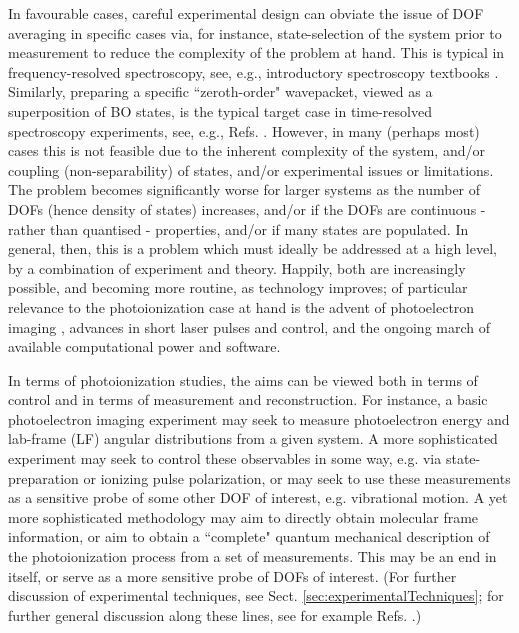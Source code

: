 \documentclass[10pt]{article}
\begin{document}
In favourable cases, careful experimental design can obviate the issue of DOF averaging in specific cases via, for instance, state-selection of the system prior to measurement to reduce the complexity of the problem at hand. This is typical in frequency-resolved spectroscopy, see, e.g., introductory spectroscopy textbooks \cite{bunkerMolSymm, herzberg1945molecular, hollasHighRes}. Similarly, preparing a specific ``zeroth-order" wavepacket, viewed as a superposition of BO states, is the typical target case in time-resolved spectroscopy experiments, see, e.g., Refs. \cite{Tannor2007,Stolow2008,wu2011TimeresolvedPhotoelectronSpectroscopy}. However, in many (perhaps most) cases this is not feasible due to the inherent complexity of the system, and/or coupling (non-separability) of states, and/or experimental issues or limitations. The problem becomes significantly worse for larger systems as the number of DOFs (hence density of states) increases, and/or if the DOFs are continuous - rather than quantised - properties, and/or if many states are populated. In general, then, this is a problem which must ideally be addressed at a high level, by a combination of experiment and theory. Happily, both are increasingly possible, and becoming more routine, as technology improves; of particular relevance to the photoionization case at hand is the advent of photoelectron imaging \cite{Whitaker2003}, advances in short laser pulses and control, and the ongoing march of available computational power and software.

In terms of photoionization studies, the aims can be viewed both in terms of control and in terms of measurement and reconstruction. For instance, a basic photoelectron imaging experiment may seek to measure photoelectron energy and lab-frame (LF) angular distributions from a given system. A more sophisticated experiment may seek to control these observables in some way, e.g. via state-preparation or ionizing pulse polarization, or may seek to use these measurements as a sensitive probe of some other DOF of interest, e.g. vibrational motion. A yet more sophisticated methodology may aim to directly obtain molecular frame information, or aim to obtain a ``complete" quantum mechanical description of the photoionization process from a set of measurements. This may be an end in itself, or serve as a more sensitive probe of DOFs of interest. (For further discussion of experimental techniques, see Sect. \ref{sec:experimentalTechniques}; for further general discussion along these lines, see for example Refs. \cite{hockett2018QMP1, kleinpoppen2013perfect, Reid2012, Stolow2008}.)
\end{document}
